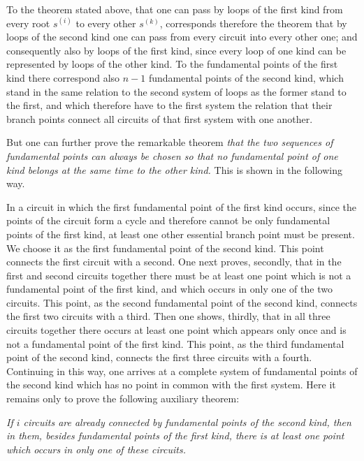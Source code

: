 \documentclass[10pt]{article}
\begin{document}
To the theorem stated above, that one can pass by loops of the first kind from every root \(s^{(i)}\) to every other \(s^{(k)}\), corresponds therefore the theorem that by loops of the second kind one can pass from every circuit into every other one; and consequently also by loops of the first kind, since every loop of one kind can be represented by loops of the other kind. To the fundamental points of the first kind there correspond also \(n-1\) fundamental points of the second kind, which stand in the same relation to the second system of loops as the former stand to the first, and which therefore have to the first system the relation that their branch points connect all circuits of that first system with one another.

But one can further prove the remarkable theorem \emph{that the two sequences of fundamental points can always be chosen so that no fundamental point of one kind belongs at the same time to the other kind.} This is shown in the following way.

In a circuit in which the first fundamental point of the first kind occurs, since the points of the circuit form a cycle and therefore cannot be only fundamental points of the first kind, at least one other essential branch point must be present. We choose it as the first fundamental point of the second kind. This point connects the first circuit with a second. One next proves, secondly, that in the first and second circuits together there must be at least one point which is not a fundamental point of the first kind, and which occurs in only one of the two circuits. This point, as the second fundamental point of the second kind, connects the first two circuits with a third. Then one shows, thirdly, that in all three circuits together there occurs at least one point which appears only once and is not a fundamental point of the first kind. This point, as the third fundamental point of the second kind, connects the first three circuits with a fourth. Continuing in this way, one arrives at a complete system of fundamental points of the second kind which has no point in common with the first system. Here it remains only to prove the following auxiliary theorem:

\begin{center}
\emph{If \(i\) circuits are already connected by fundamental points of the second kind, then in them, besides fundamental points of the first kind, there is at least one point which occurs in only one of these circuits.}
\end{center}
\end{document}
